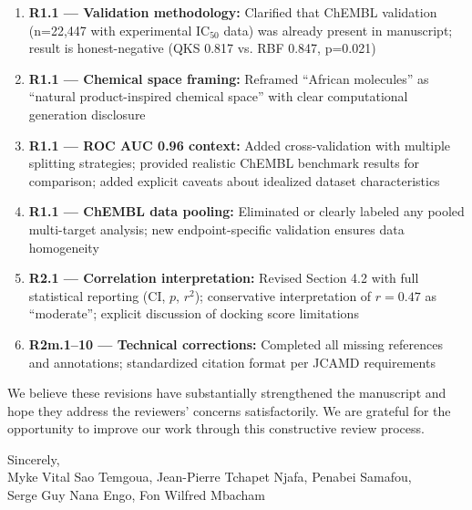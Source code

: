\documentclass[11pt]{article}
\begin{document}
\begin{enumerate}[leftmargin=1.6em]
\item \textbf{R1.1 — Validation methodology:} Clarified that ChEMBL validation (n=22,447 
with experimental IC$_{50}$ data) was already present in manuscript; result is honest-negative 
(QKS 0.817 vs. RBF 0.847, p=0.021)

\item \textbf{R1.1 — Chemical space framing:} Reframed ``African molecules'' as 
``natural product-inspired chemical space'' with clear computational generation disclosure

\item \textbf{R1.1 — ROC AUC 0.96 context:} Added cross-validation with multiple 
splitting strategies; provided realistic ChEMBL benchmark results for comparison; 
added explicit caveats about idealized dataset characteristics

\item \textbf{R1.1 — ChEMBL data pooling:} Eliminated or clearly labeled any pooled 
multi-target analysis; new endpoint-specific validation ensures data homogeneity

\item \textbf{R2.1 — Correlation interpretation:} Revised Section 4.2 with full 
statistical reporting (CI, $p$, $r^2$); conservative interpretation of $r = 0.47$ 
as ``moderate''; explicit discussion of docking score limitations

\item \textbf{R2m.1--10 — Technical corrections:} Completed all missing references 
and annotations; standardized citation format per JCAMD requirements
\end{enumerate}

%

\vspace{2em}
\noindent We believe these revisions have substantially strengthened the manuscript and 
hope they address the reviewers' concerns satisfactorily. We are grateful for the 
opportunity to improve our work through this constructive review process.

\vspace{1em}
\noindent Sincerely,\\
Myke Vital Sao Temgoua, Jean-Pierre Tchapet Njafa, Penabei Samafou,\\
Serge Guy Nana Engo, Fon Wilfred Mbacham
\end{document}
